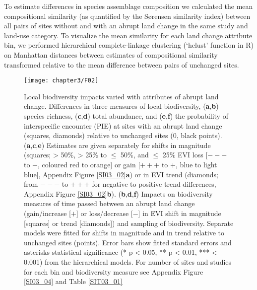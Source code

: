 To estimate differences in species assemblage composition we calculated the mean compositional similarity (as quantified by the S\o rensen similarity index) between all pairs of sites without and with an abrupt land change in the same study and land-use category. To visualize the mean similarity for each land change attribute bin, we performed hierarchical complete-linkage clustering (‘hclust’ function in R) on Manhattan distances between estimates of compositional similarity transformed relative to the mean difference between pairs of unchanged sites.

\begin{figure}[!htb]
\centering
\texttt{[image: chapter3/F02]}
\caption{Local biodiversity impacts varied with attributes of abrupt land change. Differences in three measures of local biodiversity, (\textbf{a},\textbf{b}) species richness, (\textbf{c},\textbf{d}) total abundance, and (\textbf{e},\textbf{f}) the probability of interspecific encounter (PIE) at sites with an abrupt land change (squares, diamonds) relative to unchanged sites (0, black points). (\textbf{a},\textbf{c},\textbf{e}) Estimates are given separately for shifts in magnitude (squares; > 50\%, > 25\% to $\leq$ 50\%, and $\leq$ 25\% EVI loss [$---$ to $-$, coloured red to orange] or gain [$+++$ to $+$, blue to light blue], Appendix Figure \ref{SI03_02}\textbf{a}) or in EVI trend (diamonds; from $---$ to $+++$ for negative to positive trend differences, Appendix Figure \ref{SI03_02}\textbf{b}). (\textbf{b},\textbf{d},\textbf{f}) Impacts on biodiversity measures of time passed between an abrupt land change (gain/increase [$+$] or loss/decrease [$-$] in EVI shift in magnitude [squares] or trend [diamonds]) and sampling of biodiversity. Separate models were fitted for shifts in magnitude and in trend relative to unchanged sites (points). Error bars show fitted standard errors and asterisks statistical significance (* p < 0.05, ** p < 0.01, *** < 0.001) from the hierarchical models. For number of sites and studies for each bin and biodiversity measure see Appendix Figure \ref{SI03_04} and Table \ref{SIT03_01}}
\label{F03_02}
\end{figure}


